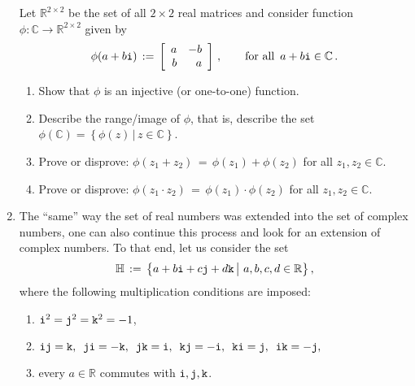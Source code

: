 \documentclass[11pt,table]{article}
\newcommand {\mat}  [1] {\left[\begin{array}{#1}}
\newcommand {\rix}      {\end{array}\right]}
\newcommand{\<}			{\langle}
\renewcommand{\>}      		{\rangle}
\newcommand{\bC}		{\mathbb{C}}
\newcommand{\bH}		{\mathbb{H}}
\newcommand{\bR}		{\mathbb{R}}
\begin{document}
\begin{enumerate}
\medskip

Let $\bR^{2 \times 2}$ be the set of all $2 \times 2$ 
real matrices and consider function 
$\phi: \bC \rightarrow \bR^{2 \times 2}$ 
given by 
\begin{equation} \label{eq:iso-cmplx-2x2}
\phi(a + b{\tt i}) 
\, := \, 
\mat{rr}
a & -b \\
b & a 
\rix \, , 
\qquad 
\textup{for all } \, a + b {\tt i} \in \bC \, .
\end{equation}
\begin{enumerate}[\rm (a)]
\item 
Show that $\phi$ is an injective (or one-to-one) function. 

\item 
Describe the range/image of $\phi$, that is, 
describe the set $\phi(\bC) = \left\{ \phi(z) \, | \, z \in \bC \right\}$. 

\item 
Prove or disprove: $\phi (z_1 + z_2) \, = \, \phi(z_1) + \phi(z_2)$ 
for all $z_1, z_2 \in \bC$. 

\item 
Prove or disprove: $\phi (z_1 \cdot z_2) \, = \, \phi(z_1) \cdot \phi(z_2)$ 
for all $z_1, z_2 \in \bC$. 


\end{enumerate} 


\medskip
\item 
The ``same'' way the set of real numbers 
was extended into the set of complex numbers, 
one can also continue this process and look 
for an extension of complex numbers. 
To that end, let us consider the set 
\begin{equation} \label{eq:quat-def}
\bH \, := \, 
\big\{ 
a + b {\tt i} + c {\tt j} + d {\tt k}  \, \big| \,\, 
a, b, c, d \in \bR 
\big\} \, ,
\end{equation} 
where the following multiplication conditions are imposed: 
\begin{enumerate}[\rm (i)] 
\item 
$ {\tt i}^2 = {\tt j}^2 ={\tt k}^2 = -1$,

\item 
${\tt i}{\tt j}={\tt k}, \,\,\, 
{\tt j}{\tt i}=-{\tt k}, \, \,\,
{\tt j}{\tt k}={\tt i}, \, \,\,
{\tt k}{\tt j}=-{\tt i}, \, \,\,
{\tt k}{\tt i}={\tt j}, \, \,\,
{\tt i}{\tt k}=-{\tt j},$

\item 
every $a\in \bR$ commutes with ${\tt i}, {\tt j}, {\tt k}$.
\end{enumerate} 


\end{enumerate}
\end{document}
